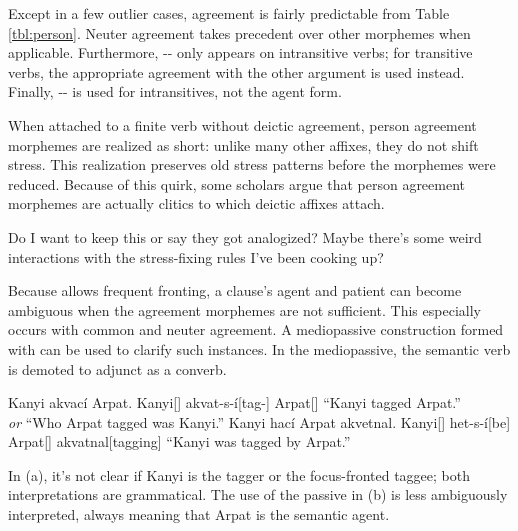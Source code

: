 Except in a few outlier cases, agreement is fairly predictable from Table \ref{tbl:person}. Neuter agreement takes precedent over other morphemes when applicable. Furthermore, -- only appears on intransitive verbs; for transitive verbs, the appropriate agreement with the other argument is used instead. Finally, -- is used for intransitives, not the agent form.

When attached to a finite verb without deictic agreement, person agreement morphemes are realized as short: unlike many other affixes, they do not shift stress. This realization preserves old stress patterns before the morphemes were reduced. Because of this quirk, some scholars argue that person agreement morphemes are actually clitics to which deictic affixes attach.

\begin{kaobox}[frametitle=\sc todo:]
	Do I want to keep this or say they got analogized? Maybe there's some weird interactions with the stress-fixing rules I've been cooking up?
\end{kaobox}

Because \langname{} allows frequent fronting, a clause's agent and patient can become ambiguous when the agreement morphemes are not sufficient. This especially occurs with common and neuter agreement. A mediopassive construction formed with  can be used to clarify such instances. In the mediopassive, the semantic verb is demoted to adjunct as a converb.

\begin{gloss*}
	\a \begingl
		\glpreamble Kanyi akvací Arpat. \endpreamble
			Kanyi[]
			akvat-s-í[tag-]
			Arpat[]
		\glft “Kanyi tagged Arpat.” \\ \textit{or} “Who Arpat tagged was Kanyi.”
	\endgl
	\a \begingl
		\glpreamble Kanyi hací Arpat akvetnal. \endpreamble
			Kanyi[]
			het-s-í[be]
			Arpat[]
			akvatnal[tagging]
		\glft “Kanyi was tagged by Arpat.”
	\endgl
\end{gloss*}

In (\lastx a), it's not clear if Kanyi is the tagger or the focus-fronted taggee; both interpretations are grammatical. The use of the passive in (\lastx b) is less ambiguously interpreted, always meaning that Arpat is the semantic agent.

